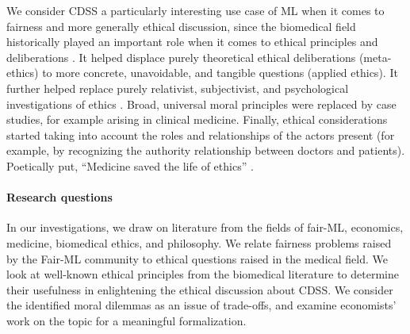 We consider CDSS a particularly interesting use case of ML when it comes to fairness and more generally ethical discussion, since the biomedical field historically played an important role when it comes to ethical principles and deliberations \cite{Toulmin1982}\cite{Hardin1989}.
It helped displace purely theoretical ethical deliberations (meta-ethics) to more concrete, unavoidable, and tangible questions (applied ethics).
It further helped replace purely relativist, subjectivist, and psychological investigations of ethics \cite{Toulmin1982}.
Broad, universal moral principles were replaced by case studies, for example arising in clinical medicine.
Finally, ethical considerations started taking into account the roles and relationships of the actors present (for example, by recognizing the authority relationship between doctors and patients).
Poetically put, ``Medicine saved the life of ethics'' \cite{Toulmin1982}.

\paragraph{Research questions}

In our investigations, we draw on literature from the fields of fair-ML, economics, medicine, biomedical ethics, and philosophy.
We relate fairness problems raised by the Fair-ML community to ethical questions raised in the medical field.
We look at well-known ethical principles from the biomedical literature to determine their usefulness in enlightening the ethical discussion about CDSS.
We consider the identified moral dilemmas as an issue of trade-offs, and examine economists' work on the topic for a meaningful formalization.
